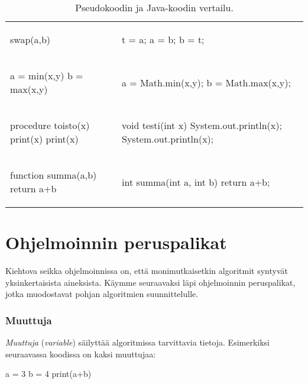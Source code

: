 \begin{table}
\begin{tabular}{ll}
\begin{smallcode}[xleftmargin=0pt]
swap(a,b)
\end{smallcode}
&
\begin{smallcode}
t = a; a = b; b = t;
\end{smallcode}
\\
\begin{smallcode}[xleftmargin=0pt]
a = min(x,y)
b = max(x,y)
\end{smallcode}
&
\begin{smallcode}
a = Math.min(x,y);
b = Math.max(x,y);
\end{smallcode}
\\
\begin{smallcode}[xleftmargin=0pt]
procedure toisto(x)
    print(x)
    print(x)
\end{smallcode}
&
\begin{smallcode}
void testi(int x) {
    System.out.println(x);
    System.out.println(x);
}
\end{smallcode}
\\
\begin{smallcode}[xleftmargin=0pt]
function summa(a,b)
    return a+b
\end{smallcode}
&
\begin{smallcode}
int summa(int a, int b) {
    return a+b;
}
\end{smallcode}
\\
\end{tabular}
\caption{Pseudokoodin ja Java-koodin vertailu.}
\label{tab:psekoo}
\end{table}

\section{Ohjelmoinnin peruspalikat}

Kiehtova seikka ohjelmoinnissa on, että monimutkaisetkin algoritmit
syntyvät yksinkertaisista aineksista.
Käymme seuraavaksi läpi ohjelmoinnin peruspalikat,
jotka muodostavat pohjan algoritmien suunnittelulle.

\subsubsection{Muuttuja}


\emph{Muuttuja} (\emph{variable}) säilyttää algoritmissa tarvittavia tietoja.
Esimerkiksi seuraavassa koodissa on kaksi muuttujaa:

\begin{code}
a = 3
b = 4
print(a+b)
\end{code}

